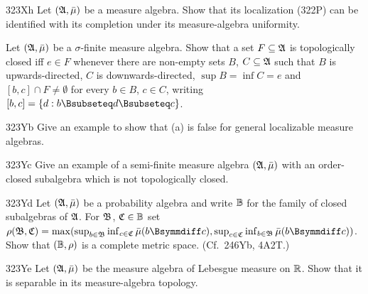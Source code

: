 {\spheader 323Xh Let $(\frak A,\bar\mu)$ be a measure algebra.  Show that
its localization (322P) can be identified with its completion under its
measure-algebra uniformity.

Let $(\frak A,\bar\mu)$ be a $\sigma$-finite
measure algebra.   Show that a set $F\subseteq\frak A$ is
topologically closed iff $e\in F$ whenever there are non-empty sets
$B$, $C\subseteq \frak A$ such that $B$ is upwards-directed,
$C$ is downwards-directed, $\sup B=\inf C=e$ and
$[b,c]\cap F\ne\emptyset$ for every $b\in B$, $c\in C$, writing
$[b,c]=\{d:b\Bsubseteq d\Bsubseteq c\}$.

\spheader 323Yb Give an example to show that (a) is false for
general localizable measure algebras.   %

\spheader 323Yc Give an example of a semi-finite measure algebra
$(\frak A,\bar\mu)$ with an order-closed subalgebra which is not
topologically closed.   %

\spheader 323Yd Let $(\frak A,\bar\mu)$ be a probability algebra and
write $\Bbb B$ for the family of closed subalgebras of $\frak A$.   For
$\frak B$, $\frak C\in\Bbb B$ set
$\rho(\frak B,\frak C)
=\max(\sup_{b\in\frak B}\inf_{c\in\frak C}\bar\mu(b\Bsymmdiff c),
\sup_{c\in\frak C}\inf_{b\in\frak B}\bar\mu(b\Bsymmdiff c))$.   Show
that $(\Bbb B,\rho)$ is a complete metric space.   (Cf.\ 246Yb, 4A2T.)

\spheader 323Ye Let $(\frak A,\bar\mu)$ be the measure algebra of
Lebesgue measure on $\Bbb R$.   Show that it is separable in its
measure-algebra topology.   

}%

